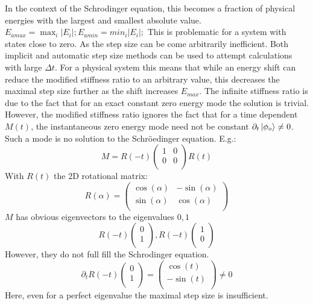 \documentclass[Master]{subfiles}
\begin{document}
In the context of the Schrodinger equation, this becomes a fraction of physical energies with the largest and smallest absolute value. $E_{amax} = \max_i|E_i|; E_{amin} = min_i|E_i|; $ This is problematic for a system with states close to zero. As the step size can be come arbitrarily inefficient. Both implicit and automatic step size methods can be used to attempt calculations with large $\Delta t$. For a physical system this means that while an energy shift can reduce the modified stiffness ratio to an arbitrary value, this decreases the maximal step size further as the shift increases $E_{max}$. The infinite stiffness ratio is due to the fact that for an exact constant zero energy mode the solution is trivial. However, the modified stiffness ratio ignores the fact that for a time dependent $M(t)$, the instantaneous zero energy mode need not be constant $\partial_t \ket{\phi_o} \neq 0$. Such a mode is no solution to the  Schröedinger equation. E.g.:
$$
M = R(-t)\left(
\begin{array}{cc}
 1 & 0 \\
 0 & 0 \\
\end{array}
\right)R(t)
$$
With $R(t)$ the 2D rotational matrix:
$$
R(\alpha) =
\left(
\begin{array}{cc}
 \cos (\alpha ) & -\sin (\alpha ) \\
 \sin (\alpha ) & \cos (\alpha ) \\
\end{array}
\right)
$$
$M$ has obvious eigenvectors to the eigenvalues $0,1$
$$
R(-t)
\left(
\begin{array}{c}
 0 \\
 1 \\
\end{array}
\right)
,
R(-t)
\left(
\begin{array}{c}
 1 \\
 0 \\
\end{array}
\right)
$$
However, they do not full fill the Schrodinger equation.
$$
\partial_t R(-t)
\left(
\begin{array}{c}
 0 \\
 1 \\
\end{array}
\right)
= 
\left(
\begin{array}{c}
 \cos(t) \\
 - \sin(t) \\
\end{array}
\right)\neq  0
$$
Here, even for a perfect eigenvalue the maximal step size is insufficient.
\end{document}

